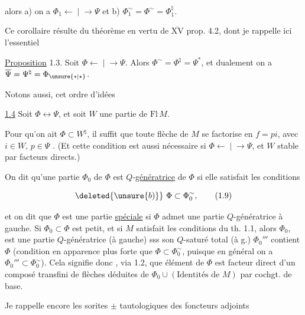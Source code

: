 alors a) on a $\Phi_1 \mathrel{\longleftarrow\!\mid\!\longrightarrow} \Psi$ et b) $\Phi_1^{\sim}=\Phi^{\sim}=\Phi_1^{\natural}$.

Ce corollaire résulte du théorème en vertu de
\uline{$\overline{\mathrm{XV}}$} prop. 4.2, dont je rappelle ici l'essentiel

\uline{Proposition} 1.3. Soit $\Phi \mathrel{\longleftarrow\!\mid\!\longrightarrow} \Psi$. Alors
$\Phi^{\sim}=\Phi^{\natural}=\Psi^{*}$, et dualement on a $\overline{\Psi}=\Psi^{\natural}=\Phi_{\unsure{*|\star}}$.

Notons aussi,  cet ordre d'idées

\uline{ 1.4} Soit $\Phi\longleftrightarrow\Psi$, et soit $W$
une partie  de $\mathrm{Fl}\,M$. 

Pour qu'on ait $\Phi\subset W^{\natural}$, il suffit que
toute flèche de $M$ se factorise en $f=pi$,
avec $i\in W$, $p\in\Psi$ . (Et cette condition
est  aussi nécessaire si $\Phi \mathrel{\longleftarrow\!\mid\!\longrightarrow} \Psi$, et $W$
stable par facteurs directs.)

On dit qu'une partie $\Phi_0$ de $\Phi$ est 
$Q$-\uline{génératrice} de $\Phi$ si elle satisfait les conditions


\[
\deleted{\unsure{b)}}\ \Phi\subset\Phi_0^{\sim},\tag*{(1.9)}
\]

et on dit que $\Phi$ est une partie \uline{spéciale} 
si $\Phi$ admet une  partie $Q$-génératrice à gauche.
Si $\Phi_0\subset\Phi$ est petit, et si $M$ satisfait les
conditions du th. 1.1, alors $\Phi_0$, est une
partie $Q$-génératrice (à gauche) sss son
$Q$-saturé total (à g.) $\Phi_0'''$ contient $\Phi$
(condition en apparence plus forte que $\Phi\subset\Phi_0^{\sim}$,
puisque en général on a $\Phi_0'''\subset\Phi_0^{\sim}$). Cela
signifie donc , via 1.2, que 
élément de $\Phi$ est facteur direct d'un composé
transfini de flèches déduites de $\Phi_0\cup(\text{Identités de }M)$
par cochgt. de base.

Je rappelle encore les sorites $\pm$ tautologiques
des foncteurs adjoints

